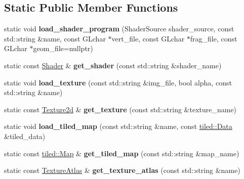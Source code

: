 \subsection*{Static Public Member Functions}
\begin{DoxyCompactItemize}
\item 
\mbox{\label{classsc2d_1_1ResourceHolder_a002e8ce4a2234d910ac958b3ee6fccc9}} 
static void {\bfseries load\+\_\+shader\+\_\+program} (Shader\+Source shader\+\_\+source, const std\+::string \&name, const G\+Lchar $\ast$vert\+\_\+file, const G\+Lchar $\ast$frag\+\_\+file, const G\+Lchar $\ast$geom\+\_\+file=nullptr)
\item 
\mbox{\label{classsc2d_1_1ResourceHolder_a30cd14f405e3a3757b60ab5e51749c4d}} 
static const \hyperlink{classsc2d_1_1Shader}{Shader} \& {\bfseries get\+\_\+shader} (const std\+::string \&shader\+\_\+name)
\item 
\mbox{\label{classsc2d_1_1ResourceHolder_ae9a326d5aec50519aab43ef1e7768775}} 
static void {\bfseries load\+\_\+texture} (const std\+::string \&img\+\_\+file, bool alpha, const std\+::string \&name)
\item 
\mbox{\label{classsc2d_1_1ResourceHolder_abc05dbde621341b1731d34a6e3aa48ab}} 
static const \hyperlink{classsc2d_1_1Texture2d}{Texture2d} \& {\bfseries get\+\_\+texture} (const std\+::string \&texture\+\_\+name)
\item 
\mbox{\label{classsc2d_1_1ResourceHolder_a50f13bfe2c89d66c54747a0d101cf32b}} 
static void {\bfseries load\+\_\+tiled\+\_\+map} (const std\+::string \&name, const \hyperlink{structsc2d_1_1tiled_1_1Data}{tiled\+::\+Data} \&tiled\+\_\+data)
\item 
\mbox{\label{classsc2d_1_1ResourceHolder_a1fb1920d009bd23afa147aa519703918}} 
static const \hyperlink{classsc2d_1_1tiled_1_1Map}{tiled\+::\+Map} \& {\bfseries get\+\_\+tiled\+\_\+map} (const std\+::string \&map\+\_\+name)
\item 
\mbox{\label{classsc2d_1_1ResourceHolder_a7496cdf8932acadf40621e5cdae7c035}} 
static const \hyperlink{classsc2d_1_1TextureAtlas}{Texture\+Atlas} \& {\bfseries get\+\_\+texture\+\_\+atlas} (const std\+::string \&name)

\end{DoxyCompactItemize}
